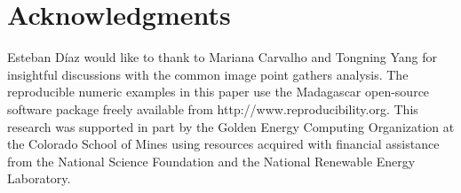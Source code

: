 \section{Acknowledgments}
Esteban D\'{i}az would like to thank to Mariana Carvalho and Tongning Yang for insightful discussions
with the common image point gathers analysis.
%
%
The reproducible numeric examples in this paper use the Madagascar open-source software package freely available from http://www.reproducibility.org.
%
This research was supported in part by the Golden Energy Computing Organization at the Colorado School of Mines using resources acquired with financial assistance from the National Science Foundation and the National Renewable Energy Laboratory.
